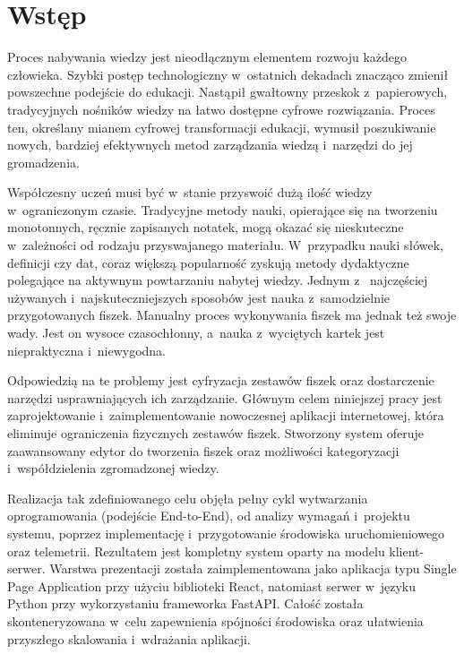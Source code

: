 \chapter{Wstęp}
\label{ch:wstep}

Proces nabywania wiedzy jest nieodłącznym elementem rozwoju każdego człowieka. Szybki postęp technologiczny w~ostatnich dekadach znacząco zmienił 
powszechne podejście do edukacji. Nastąpił gwałtowny przeskok z~papierowych, tradycyjnych nośników wiedzy na łatwo dostępne cyfrowe rozwiązania. 
Proces ten, określany mianem cyfrowej transformacji edukacji, wymusił poszukiwanie nowych, 
bardziej efektywnych metod zarządzania wiedzą i~narzędzi do jej gromadzenia.

Współczesny uczeń musi być w~stanie przyswoić dużą ilość wiedzy w~ograniczonym czasie. Tradycyjne metody nauki, opierające się na tworzeniu 
monotonnych, ręcznie zapisanych notatek, mogą okazać się nieskuteczne w~zależności od rodzaju przyswajanego materiału. W~przypadku nauki 
słówek, definicji czy dat, coraz większą popularność zyskują metody dydaktyczne polegające na aktywnym powtarzaniu nabytej wiedzy. Jednym z~
najczęściej używanych i~najskuteczniejszych sposobów jest nauka z~samodzielnie przygotowanych fiszek. Manualny proces wykonywania fiszek ma 
jednak też swoje wady. Jest on wysoce czasochłonny, a~nauka z~wyciętych kartek jest niepraktyczna i~niewygodna.

Odpowiedzią na te problemy jest cyfryzacja zestawów fiszek oraz dostarczenie narzędzi usprawniających ich zarządzanie. Głównym celem niniejszej 
pracy jest zaprojektowanie i~zaimplementowanie nowoczesnej aplikacji internetowej, która eliminuje ograniczenia fizycznych zestawów fiszek.
Stworzony system oferuje zaawansowany edytor do tworzenia fiszek oraz możliwości kategoryzacji i~współdzielenia zgromadzonej wiedzy.

Realizacja tak zdefiniowanego celu objęła pełny cykl wytwarzania oprogramowania (podejście End-to-End), od analizy wymagań i~projektu systemu, 
poprzez implementację i~przygotowanie środowiska uruchomieniowego oraz telemetrii. Rezultatem jest kompletny system oparty na modelu 
klient-serwer. Warstwa prezentacji została zaimplementowana jako aplikacja typu Single Page Application przy użyciu biblioteki React, 
natomiast serwer w~języku Python przy wykorzystaniu frameworka FastAPI. Całość została skonteneryzowana w~celu zapewnienia spójności środowiska 
oraz ułatwienia przyszłego skalowania i~wdrażania aplikacji.

